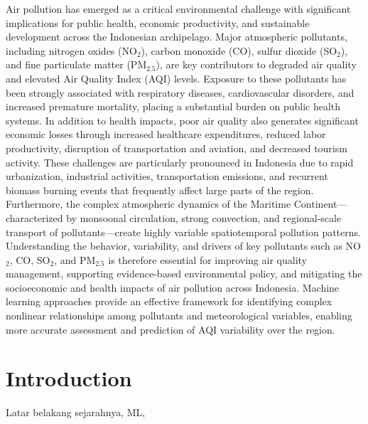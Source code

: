 \documentclass[pdflatex,sn-mathphys-num]{sn-jnl}%
\theoremstyle{thmstyleone}%
\theoremstyle{thmstyletwo}%
\theoremstyle{thmstylethree}%
\begin{document}
{Air pollution has emerged as a critical environmental challenge with significant implications for public health, economic productivity, and sustainable development across the Indonesian archipelago. Major atmospheric pollutants, including nitrogen oxides (NO$_2$), carbon monoxide (CO), sulfur dioxide (SO$_2$), and fine particulate matter (PM$_{2.5}$), are key contributors to degraded air quality and elevated Air Quality Index (AQI) levels. Exposure to these pollutants has been strongly associated with respiratory diseases, cardiovascular disorders, and increased premature mortality, placing a substantial burden on public health systems. In addition to health impacts, poor air quality also generates significant economic losses through increased healthcare expenditures, reduced labor productivity, disruption of transportation and aviation, and decreased tourism activity. These challenges are particularly pronounced in Indonesia due to rapid urbanization, industrial activities, transportation emissions, and recurrent biomass burning events that frequently affect large parts of the region. Furthermore, the complex atmospheric dynamics of the Maritime Continent—characterized by monsoonal circulation, strong convection, and regional-scale transport of pollutants—create highly variable spatiotemporal pollution patterns. Understanding the behavior, variability, and drivers of key pollutants such as NO$_2$, CO, SO$_2$, and PM$_{2.5}$ is therefore essential for improving air quality management, supporting evidence-based environmental policy, and mitigating the socioeconomic and health impacts of air pollution across Indonesia. Machine learning approaches provide an effective framework for identifying complex nonlinear relationships among pollutants and meteorological variables, enabling more accurate assessment and prediction of AQI variability over the region.

}



\maketitle
\section{Introduction}\label{sec1}
Latar belakang sejarahnya, ML, 
\end{document}
